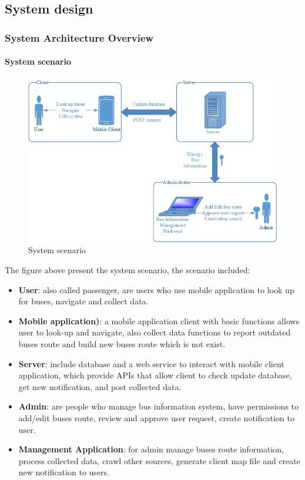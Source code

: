 \subsection{System design}
	\subsubsection{System Architecture Overview}
		\paragraph{System scenario}
			\begin{figure}[H]
				\centering
				\includegraphics[scale=4.0]{Chapters/Fig/system-scenario.png}
				\caption{System scenario}
				\label{fig:system-scenario}
			\end{figure}
			The figure above present the system scenario, the scenario included:
			\begin{itemize}
				\item \textbf{User}: also called passenger, are users who use mobile application to look up for buses, navigate and collect data.
				\item \textbf{Mobile application)}: a mobile application client with basic functions allows user to look-up and navigate, also collect data functions to report outdated buses route and build new buses route which is not exist.
				\item \textbf{Server}: include database and a web service to interact with mobile client application, which provide APIs that allow client to check update database, get new notification, and post collected data.
				\item \textbf{Admin}: are people who manage bus information system, have permissions to add/edit buses route, review and approve user request, create notification to user.
				\item \textbf{Management Application}: for admin manage buses route information, process collected data, crawl other sources, generate client map file and create new notification to users.
			\end{itemize}

